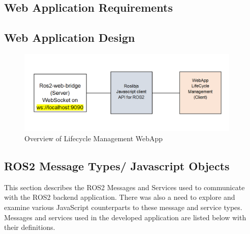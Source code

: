 \subsection{Web Application Requirements}

\subsection{Web Application Design}
	\begin{figure}[H]
		\centering
		\includegraphics[width=0.95\textwidth]{"Bilder/webapp-design.png"}
		\caption{Overview of Lifecycle Management WebApp}
		\label{fig:Background:WebappDesign}					
	\end{figure}

\subsection{ROS2 Message Types/ Javascript Objects}
This section describes the ROS2 Messages and Services used to communicate with the ROS2 backend application. There was also a need to explore and examine various JavaScript counterparts to these message and service types. Messages and services  used in the developed application are listed below with their definitions. 

